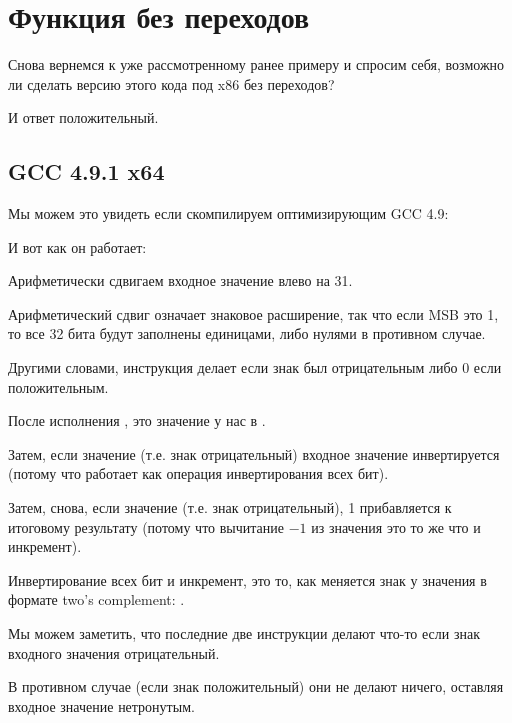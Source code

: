 \chapter{Функция  без переходов}
\label{chap:branchless_abs}

Снова вернемся к уже рассмотренному ранее примеру  и спросим себя, возможно ли
сделать версию этого кода под x86 без переходов?



И ответ положительный.

\section{\Optimizing GCC 4.9.1 x64}

Мы можем это увидеть если скомпилируем оптимизирующим GCC 4.9:



И вот как он работает:

Арифметически сдвигаем входное значение влево на 31.

Арифметический сдвиг означает знаковое расширение, так что если \ac{MSB} это 1, то все 32 бита будут
заполнены единицами, либо нулями в противном случае.

Другими словами, инструкция  делает  если знак был отрицательным либо 0 если
положительным.

После исполнения , это значение у нас в \EDX.

Затем, если значение  (т.е. знак отрицательный) входное значение инвертируется
(потому что  работает как операция инвертирования всех бит).

Затем, снова, если значение  (т.е. знак отрицательный), 1 прибавляется к итоговому результату
(потому что вычитание $-1$ из значения это то же что и инкремент).

Инвертирование всех бит и инкремент, это то, как меняется знак у значения в формате two's complement: 
.

Мы можем заметить, что последние две инструкции делают что-то если знак входного значения отрицательный.

В противном случае (если знак положительный) они не делают ничего, оставляя входное значение нетронутым.

